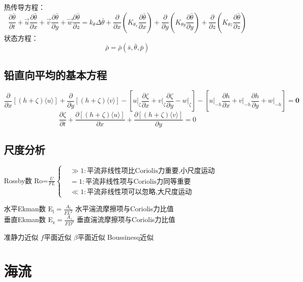 \documentclass[a4paper,12pt]{article}
\begin{document}
\begin{framed}
\[    \]
    热传导方程：
    \[
        \frac{\partial \bar{\theta}}{\partial t}+\vec{u} \frac{\partial \bar{\theta}}{\partial x}+\vec{v} \frac{\partial \bar{\theta}}{\partial y}+\vec{w} \frac{\partial \bar{\theta}}{\partial z}=k_{\theta} \Delta \bar{\theta}+\frac{\partial}{\partial x}\left(K_{\theta_{x}} \frac{\partial \bar{\theta}}{\partial x}\right)+\frac{\partial}{\partial y}\left(K_{\theta y} \frac{\partial \bar{\theta}}{\partial y}\right)+\frac{\partial}{\partial z}\left(K_{\theta z} \frac{\partial \bar{\theta}}{\partial z}\right)
    \]
    状态方程：
    \[
        \bar{\rho}=\bar{\rho}(\bar{s}, \bar{\theta}, \bar{p})
    \]
    \end{framed}
    \subsection{铅直向平均的基本方程}
    \[
        \frac{\partial}{\partial x}[(h+\zeta)\langle u\rangle]+\frac{\partial}{\partial y}[(h+\zeta)\langle v\rangle]-\left[\left.{u}\right|_{\zeta} \frac{\partial \zeta}{\partial x}+\left.{v}\right|_{\zeta} \frac{\partial \zeta}{\partial y}-\left.{w}\right|_{\zeta}\right]-\left[\left.{u}\right|_{-h} \frac{\partial {h}}{\partial {x}}+\left.{v}\right|_{-h} \frac{\partial {h}}{\partial {y}}+\left.{w}\right|_{-h}\right]=\mathbf{0}
    \]
    \[
        \frac{\partial \zeta}{\partial t}+\frac{\partial[(h+\zeta)\langle u\rangle]}{\partial x}+\frac{\partial[(h+\zeta)\langle v\rangle]}{\partial y}=0
    \]
    \subsection{尺度分析}
    Rossby数 Ro=$\displaystyle \frac{U}{FL}\left\{\begin{aligned}&\gg 1:\mbox{平流非线性项比Coriolis力重要,小尺度运动}\\ &=1:\mbox{平流非线性项与Coriolis力同等重要}\\ &\ll 1:\mbox{平流非线性项可以忽略,大尺度运动}\end{aligned}\right.$\\
    \begin{spacing}{2}
        水平Ekman数 E$\displaystyle _\mathrm{l}=\frac{A_l}{FL^2}$ 水平湍流摩擦项与Coriolis力比值\\
        垂直Ekman数 E$\displaystyle _\mathrm{z}=\frac{A_z}{FD^2}$ 垂直湍流摩擦项与Coriolis力比值
    \end{spacing}
    准静力近似 $f$平面近似 $\beta$平面近似 Boussinesq近似
    \section{海流}
\end{document}
